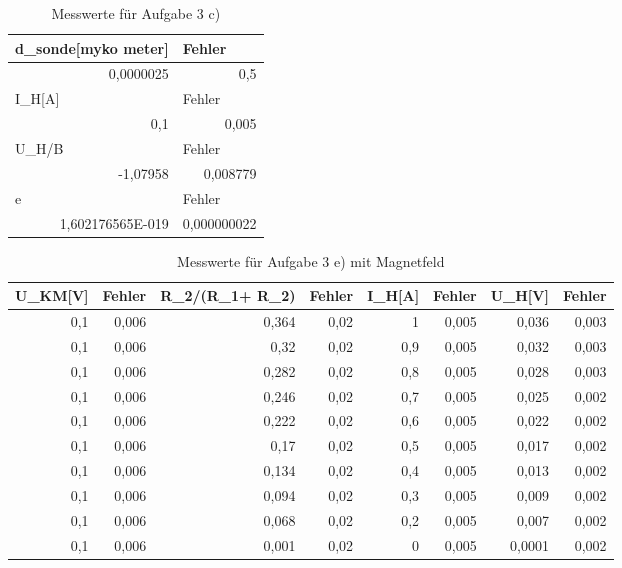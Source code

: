 \documentclass[12pt]{scrartcl}
\begin{document}
\begin{table}[htbp]
\caption{Messwerte für Aufgabe 3 c)}
\begin{center}
\begin{tabular}{|l|l|}
\hline
d\_sonde[myko meter] & Fehler \\ \hline
\multicolumn{1}{|r|}{0,0000025} & \multicolumn{1}{r|}{0,5} \\ \hline
I\_H[A] & Fehler \\ \hline
\multicolumn{1}{|r|}{0,1} & \multicolumn{1}{r|}{0,005} \\ \hline
U\_H/B & Fehler \\ \hline
\multicolumn{1}{|r|}{-1,07958} & \multicolumn{1}{r|}{0,008779} \\ \hline
e & Fehler \\ \hline
\multicolumn{1}{|r|}{1,602176565E-019} & \multicolumn{1}{r|}{0,000000022} \\ \hline
\end{tabular}
\end{center}
\label{aufgabe_3_c}
\end{table}


\begin{table}[htbp]
\caption{Messwerte für Aufgabe 3 e) mit Magnetfeld}
\begin{center}
\begin{tabular}{|r|r|r|r|r|r|r|r|}
\hline
\multicolumn{1}{|l|}{U\_KM[V]} & \multicolumn{1}{l|}{Fehler} & \multicolumn{1}{l|}{R\_2/(R\_1+ R\_2)} & \multicolumn{1}{l|}{Fehler} & \multicolumn{1}{l|}{I\_H[A]} & \multicolumn{1}{l|}{Fehler} & \multicolumn{1}{l|}{U\_H[V]} & \multicolumn{1}{l|}{Fehler} \\ \hline
0,1 & 0,006 & 0,364 & 0,02 & 1 & 0,005 & 0,036 & 0,003 \\ \hline
0,1 & 0,006 & 0,32 & 0,02 & 0,9 & 0,005 & 0,032 & 0,003 \\ \hline
0,1 & 0,006 & 0,282 & 0,02 & 0,8 & 0,005 & 0,028 & 0,003 \\ \hline
0,1 & 0,006 & 0,246 & 0,02 & 0,7 & 0,005 & 0,025 & 0,002 \\ \hline
0,1 & 0,006 & 0,222 & 0,02 & 0,6 & 0,005 & 0,022 & 0,002 \\ \hline
0,1 & 0,006 & 0,17 & 0,02 & 0,5 & 0,005 & 0,017 & 0,002 \\ \hline
0,1 & 0,006 & 0,134 & 0,02 & 0,4 & 0,005 & 0,013 & 0,002 \\ \hline
0,1 & 0,006 & 0,094 & 0,02 & 0,3 & 0,005 & 0,009 & 0,002 \\ \hline
0,1 & 0,006 & 0,068 & 0,02 & 0,2 & 0,005 & 0,007 & 0,002 \\ \hline
0,1 & 0,006 & 0,001 & 0,02 & 0 & 0,005 & 0,0001 & 0,002 \\ \hline
\end{tabular}
\end{center}
\label{aufgabe_3_e_m}
\end{table}
\end{document}
